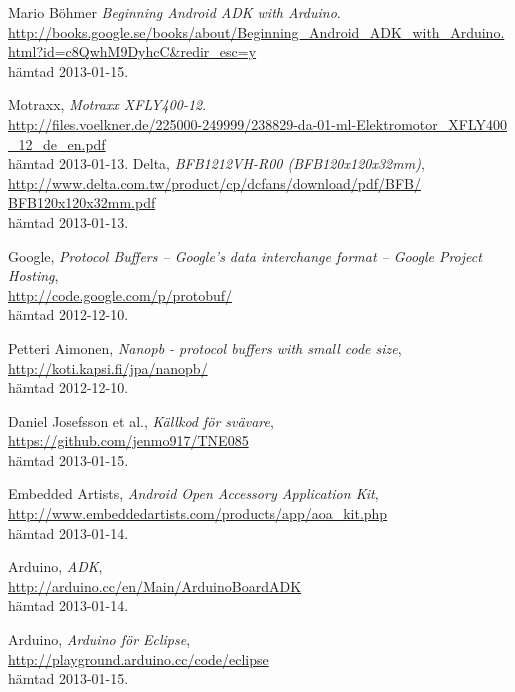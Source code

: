 \begin{thebibliography}{9}
Mario Böhmer
\emph{Beginning Android ADK with Arduino}. \\
\url{http://books.google.se/books/about/Beginning_Android_ADK_with_Arduino.html?id=c8QwhM9DyhcC&redir_esc=y}
\\
hämtad 2013-01-15.

Motraxx,
\emph{Motraxx XFLY400-12}. \\
\url{http://files.voelkner.de/225000-249999/238829-da-01-ml-Elektromotor_XFLY400
_12_de_en.pdf}
\\ hämtad 2013-01-13.
Delta,
\emph{BFB1212VH-R00 (BFB120x120x32mm)},\\
\url{http://www.delta.com.tw/product/cp/dcfans/download/pdf/BFB/
BFB120x120x32mm.pdf}
\\ hämtad 2013-01-13.

Google,
\emph{Protocol Buffers – Google's data interchange format – Google Project
Hosting}, \\
\url{http://code.google.com/p/protobuf/} \\
hämtad 2012-12-10.

Petteri Aimonen,
\emph{Nanopb - protocol buffers with small code size}, \\
\url{http://koti.kapsi.fi/jpa/nanopb/} \\
hämtad 2012-12-10.

Daniel Josefsson et al.,
\emph{Källkod för svävare}, \\
\url{https://github.com/jenmo917/TNE085} \\
hämtad 2013-01-15.

Embedded Artists,
\emph{Android Open Accessory Application Kit}, \\
\url{http://www.embeddedartists.com/products/app/aoa_kit.php} \\
hämtad 2013-01-14.

Arduino,
\emph{ADK}, \\
\url{http://arduino.cc/en/Main/ArduinoBoardADK} \\
hämtad 2013-01-14.

Arduino,
\emph{Arduino för Eclipse}, \\
\url{http://playground.arduino.cc/code/eclipse} \\
hämtad 2013-01-15.


\end{thebibliography}
